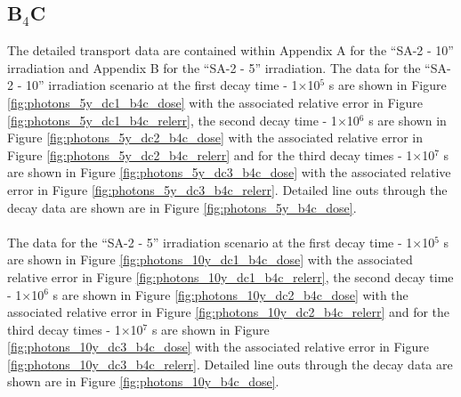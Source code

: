 \documentclass[12pt]{article}
\begin{document}
\subsection{B$_4$C}
\label{sec:sdr_results_b4c}
The detailed transport data are contained within Appendix A for the ``SA-2 - 10'' irradiation
and Appendix B for the ``SA-2 - 5'' irradiation. The data for the ``SA-2 - 10'' irradiation scenario
at the first decay time - 1$\times$10$^5$ s are shown in Figure \ref{fig:photons_5y_dc1_b4c_dose} with the
associated relative error in Figure \ref{fig:photons_5y_dc1_b4c_relerr}, the second
decay time - 1$\times$10$^6$ s are shown in Figure \ref{fig:photons_5y_dc2_b4c_dose} with the
associated relative error in Figure \ref{fig:photons_5y_dc2_b4c_relerr} and for the
third decay times - 1$\times$10$^7$ s are shown in Figure \ref{fig:photons_5y_dc3_b4c_dose} with the
associated relative error in Figure \ref{fig:photons_5y_dc3_b4c_relerr}. Detailed line outs
through the decay data are shown are in Figure \ref{fig:photons_5y_b4c_dose}.
\\
\\
The data for the ``SA-2 - 5'' irradiation scenario
at the first decay time - 1$\times$10$^5$ s are shown in Figure \ref{fig:photons_10y_dc1_b4c_dose} with the
associated relative error in Figure \ref{fig:photons_10y_dc1_b4c_relerr}, the second
decay time - 1$\times$10$^6$ s are shown in Figure \ref{fig:photons_10y_dc2_b4c_dose} with the
associated relative error in Figure \ref{fig:photons_10y_dc2_b4c_relerr} and for the
third decay times - 1$\times$10$^7$ s are shown in Figure \ref{fig:photons_10y_dc3_b4c_dose} with the
associated relative error in Figure \ref{fig:photons_10y_dc3_b4c_relerr}. Detailed line outs
through the decay data are shown are in Figure \ref{fig:photons_10y_b4c_dose}.
\newpage
\end{document}
